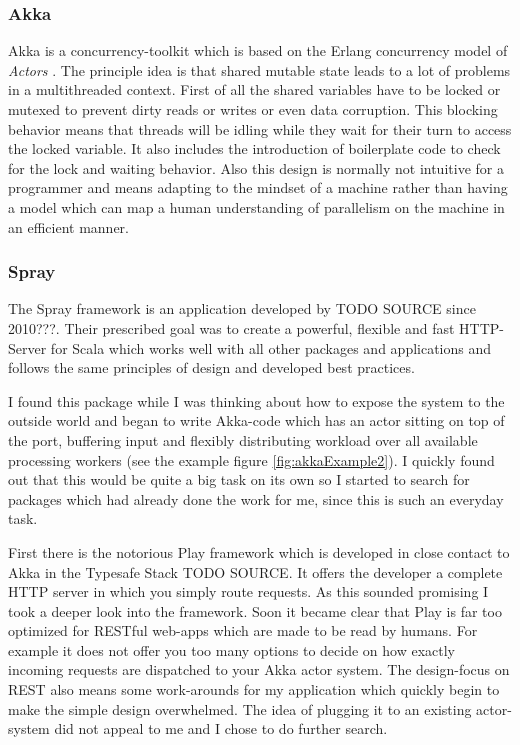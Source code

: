 \documentclass[11p]{scrartcl}
\begin{document}
\subsubsection{Akka}
\label{sec:akka}
Akka \citep{akkaHome} is a concurrency-toolkit which is based on the Erlang concurrency model of \textit{Actors} \cite{link:erlangConcurrency}.
The principle idea is that shared mutable state leads to a lot of problems in a multithreaded context. First of all the shared variables have to be locked or mutexed to prevent dirty reads or writes or even data corruption. This blocking behavior means that threads will be idling while they wait for their turn to access the locked variable. It also includes the introduction of boilerplate code to check for the lock and waiting behavior. Also this design is normally not intuitive for a programmer and means adapting to the mindset of a machine rather than having a model which can map a human understanding of parallelism on the machine in an efficient manner.

\subsubsection{Spray}
The Spray framework is an application developed by TODO SOURCE since 2010???. Their prescribed goal was to create a powerful, flexible and fast HTTP-Server for Scala which works well with all other packages and applications and follows the same principles of design and developed best practices.

I found this package while I was thinking about how to expose the system to the outside world and began to write Akka-code which has an actor sitting on top of the port, buffering input and flexibly distributing workload over all available processing workers (see the example figure \ref{fig:akkaExample2}). I quickly found out that this would be quite a big task on its own so I started to search for packages which had already done the work for me, since this is such an everyday task. 

First there is the notorious Play framework which is developed in close contact to Akka in the Typesafe Stack TODO SOURCE. 
It offers the developer a complete HTTP server in which you simply route requests. As this sounded promising I took a deeper look into the framework. Soon it became clear that Play is far too optimized for RESTful web-apps which are made to be read by humans. For example it does not offer you too many options to decide on how exactly incoming requests are dispatched to your Akka actor system. The design-focus on REST also means some work-arounds for my application which quickly begin to make the simple design overwhelmed. The idea of plugging it to an existing actor-system did not appeal to me and I chose to do further search.
\end{document}
